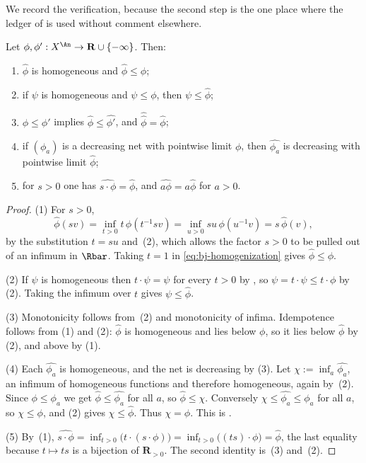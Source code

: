 We record the verification, because the second step is the one place where
the ledger of  is used without comment
elsewhere.

\begin{lemma}
\label{lem:ch35-homogenization-maximal}
Let $\phi,\phi':X^{\An}\to\mathbf R\cup\{-\infty\}$.  Then:
\begin{enumerate}
\item $\widehat\phi$ is homogeneous and $\widehat\phi\leq\phi$;
\item if $\psi$ is homogeneous and $\psi\leq\phi$, then
 $\psi\leq\widehat\phi$;
\item $\phi\leq\phi'$ implies $\widehat\phi\leq\widehat{\phi'}$, and
 $\widehat{\widehat\phi}=\widehat\phi$;
\item if $(\phi_a)$ is a decreasing net with pointwise limit $\phi$,
 then $\widehat{\phi_a}$ is decreasing with pointwise limit
 $\widehat\phi$;
\item for $s>0$ one has $\widehat{s\cdot\phi}=\widehat\phi$, and
 $\widehat{a\phi}=a\widehat\phi$ for $a>0$.
\end{enumerate}
\par
\end{lemma}

\begin{proof}
(1)  For $s>0$,
\[
 \widehat\phi(sv)=\inf_{t>0}t\,\phi(t^{-1}sv)
 =\inf_{u>0}su\,\phi(u^{-1}v)=s\,\widehat\phi(v),
\]
by the substitution $t=su$ and
\,(2), which allows the factor $s>0$ to be
pulled out of an infimum in $\Rbar$.  Taking $t=1$ in
\eqref{eq:bj-homogenization} gives $\widehat\phi\leq\phi$.

(2)  If $\psi$ is homogeneous then $t\cdot\psi=\psi$ for every $t>0$
by , so
$\psi=t\cdot\psi\leq t\cdot\phi$ by
\,(2).  Taking the infimum over $t$ gives
$\psi\leq\widehat\phi$.

(3)  Monotonicity follows from
\,(2) and monotonicity of infima.  Idempotence
follows from (1) and (2): $\widehat\phi$ is homogeneous and lies below
$\phi$, so it lies below $\widehat\phi$ by (2), and above by (1).

(4)  Each $\widehat{\phi_a}$ is homogeneous, and the net is decreasing by
(3).  Let $\chi:=\inf_a\widehat{\phi_a}$, an infimum of homogeneous
functions and therefore homogeneous, again by
\,(2).  Since $\phi\leq\phi_a$ we get
$\widehat\phi\leq\widehat{\phi_a}$ for all $a$, so
$\widehat\phi\leq\chi$.  Conversely
$\chi\leq\widehat{\phi_a}\leq\phi_a$ for all $a$, so $\chi\leq\phi$,
and (2) gives $\chi\leq\widehat\phi$.  Thus $\chi=\widehat\phi$.  This
is \cite[Lemma~6.13]{BJ22}.

(5)  By \,(1),
$\widehat{s\cdot\phi}=\inf_{t>0}\bigl(t\cdot(s\cdot\phi)\bigr)
=\inf_{t>0}\bigl((ts)\cdot\phi\bigr)=\widehat\phi$, the last equality
because $t\mapsto ts$ is a bijection of $\mathbf R_{>0}$.  The second
identity is \,(3) and
\,(2).
\end{proof}

